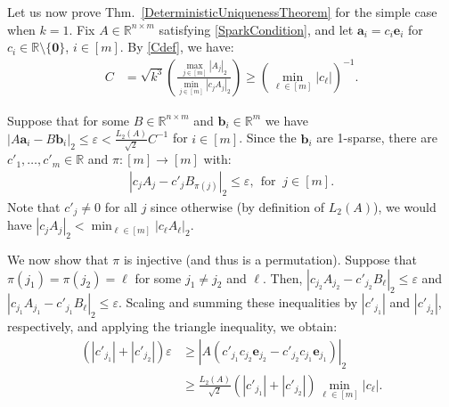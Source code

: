 \documentclass[journal, twocolumn]{IEEEtran}
\begin{document}
Let us now prove Thm.~\ref{DeterministicUniquenessTheorem} for the simple case when $k=1$. Fix $A \in \mathbb{R}^{n \times m}$ satisfying \eqref{SparkCondition}, and let $\mathbf{a}_i = c_i \mathbf{e}_i$ for $c_i \in \mathbb{R} \setminus \{\mathbf{0}\}$, $i \in [m]$. By \eqref{Cdef}, we have:
\begin{align}\label{C1}
C 
&= \sqrt{k^3} \left( \frac{\max_{j \in [m]} |A_j|_2}{\min_{j \in [m]}|c_jA_j|_2} \right)
\geq \left( \min_{\ell \in [m]} |c_{\ell}| \right)^{-1}.
\end{align}

Suppose that for some $B \in \mathbb{R}^{n \times m}$ and $\mathbf{b}_i \in \mathbb{R}^m$ we have  $|A\mathbf{a}_i - B\mathbf{b}_i|_2 \leq \varepsilon < \frac{L_2(A)}{\sqrt{2}}C^{-1}$ for $i \in [m]$. Since the $\mathbf{b}_i$ are 1-sparse, there are $c'_1, \ldots, c'_m \in \mathbb{R}$ and $\pi: [m] \to [m]$ with:
\begin{align}\label{1D}
|c_jA_j - c'_jB_{\pi(j)}|_2 \leq \varepsilon, \ \ \text{for } \  j \in [m].
\end{align} 
Note that $c'_j \neq 0$ for all $j$ since otherwise (by definition of $L_2(A)$), we would have $|c_jA_j|_2 < \min_{\ell \in [m]}|c_{\ell}A_{\ell}|_2$. 

We  now show that $\pi$ is injective (and thus is a permutation).
Suppose that $\pi(j_1) = \pi(j_2) = \ell$ for some $j_1 \neq j_2$ and $\ell$. Then, $|c_{j_2}A_{j_2} - c'_{j_2}B_{\ell}|_2 \leq \varepsilon$ and $|c_{j_1}A_{j_1} - c'_{j_1} B_{\ell}|_2  \leq \varepsilon$. Scaling and summing these inequalities by $|c'_{j_1}|$ and $|c'_{j_2}|$, respectively, and applying the triangle inequality, we obtain:
\begin{align}\label{contra}
(|c'_{j_1}| + |c'_{j_2}|) \varepsilon
&\geq |A(c'_{j_1}c_{j_2} \mathbf{e}_{j_2} - c'_{j_2}c_{j_1}\mathbf{e}_{j_1})|_2 \nonumber \\ 
&\geq \frac{L_2(A)}{\sqrt{2}} \left( |c'_{j_1}| + |c'_{j_2}| \right) \min_{\ell \in [m]} |c_\ell |.
\end{align}
%
\end{document}
